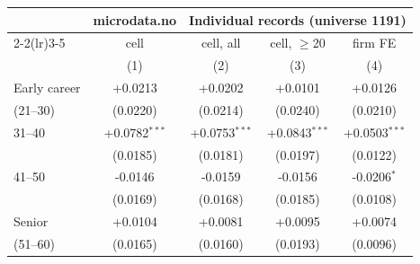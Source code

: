 \begin{tabular}{lcccc}
\toprule
 & microdata.no & \multicolumn{3}{c}{Individual records (universe 1191)} \\
\cmidrule(lr){2-2}\cmidrule(lr){3-5}
 & cell & cell, all & cell, $\geq$20 & firm FE \\
 & (1) & (2) & (3) & (4) \\
\midrule
Early career & +0.0213 & +0.0202 & +0.0101 & +0.0126 \\
(21--30) & (0.0220) & (0.0214) & (0.0240) & (0.0210) \\
31--40 & +0.0782$^{***}$ & +0.0753$^{***}$ & +0.0843$^{***}$ & +0.0503$^{***}$ \\
 & (0.0185) & (0.0181) & (0.0197) & (0.0122) \\
41--50 & -0.0146 & -0.0159 & -0.0156 & -0.0206$^{*}$ \\
 & (0.0169) & (0.0168) & (0.0185) & (0.0108) \\
Senior & +0.0104 & +0.0081 & +0.0095 & +0.0074 \\
(51--60) & (0.0165) & (0.0160) & (0.0193) & (0.0096) \\
\bottomrule
\end{tabular}

